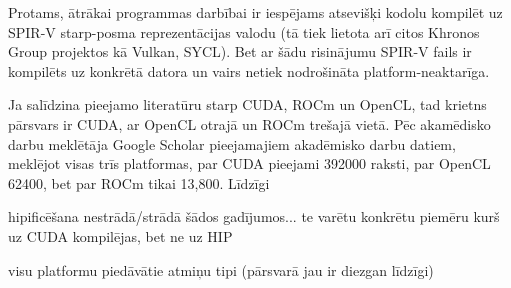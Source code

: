 Protams, ātrākai programmas darbībai ir iespējams atsevišķi kodolu kompilēt uz
SPIR-V starp-posma reprezentācijas valodu (tā tiek lietota arī citos Khronos
Group projektos kā Vulkan, SYCL). Bet ar šādu risinājumu SPIR-V fails ir
kompilēts uz konkrētā datora un vairs netiek nodrošināta platform-neaktarīga.






Ja salīdzina pieejamo literatūru starp CUDA, ROCm un OpenCL, tad krietns
pārsvars ir CUDA, ar OpenCL otrajā un ROCm trešajā vietā. Pēc akamēdisko darbu
meklētāja Google Scholar pieejamajiem akadēmisko darbu datiem, meklējot visas
trīs platformas, par CUDA pieejami 392000 raksti, par OpenCL 62400, bet par
ROCm tikai 13,800. \cite{google_scholar} Līdzīgi 

hipificēšana nestrādā/strādā šādos gadījumos...
te varētu konkrētu piemēru kurš uz CUDA kompilējas, bet ne uz HIP 

visu platformu piedāvātie atmiņu tipi (pārsvarā jau ir diezgan līdzīgi)


